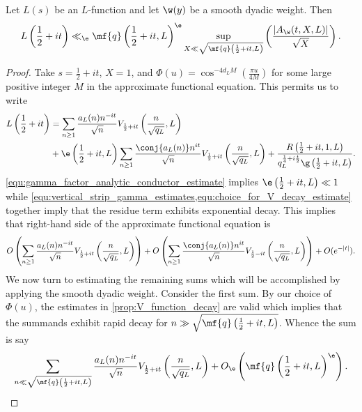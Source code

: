 \documentclass[12pt]{article}
\begin{document}
      \begin{theorem}\label{thm:critical_line_estimate}
        Let \(L(s)\) be an \(L\)-function and let \(\w(y)\) be a smooth dyadic weight. Then
        \[
          L\left(\frac{1}{2}+it\right) \ll_{\e} \mf{q}\left(\frac{1}{2}+it,L\right)^{\e}\sup_{X \ll \sqrt{\mf{q}\left(\frac{1}{2}+it,L\right)}}\left(\frac{|A_{\w}(t,X,L)|}{\sqrt{X}}\right).
        \]
      \end{theorem}
      \begin{proof}
        Take \(s = \frac{1}{2}+it\), \(X = 1\), and \(\Phi(u) = \cos^{-4d_{L}M}\left(\frac{\pi u}{4M}\right)\) for some large positive integer \(M\) in the approximate functional equation. This permits us to write
        \begin{align*}
          L\left(\frac{1}{2}+it\right) &= \sum_{n \ge 1}\frac{a_{L}(n)n^{-it}}{\sqrt{n}}V_{\frac{1}{2}+it}\left(\frac{n}{\sqrt{q_{L}}},L\right) \\
          &+ \e\left(\frac{1}{2}+it,L\right)\sum_{n \ge 1}\frac{\conj{a_{L}(n)}n^{it}}{\sqrt{n}}V_{\frac{1}{2}+it}\left(\frac{n}{\sqrt{q_{L}}},L\right)+\frac{R\left(\frac{1}{2}+it,1,L\right)}{q_{L}^{\frac{1}{4}+i\frac{t}{2}}\g\left(\frac{1}{2}+it,L\right)}.
        \end{align*}
        \cref{equ:gamma_factor_analytic_conductor_estimate} implies \(\e\left(\frac{1}{2}+it,L\right) \ll 1\) while \cref{equ:vertical_strip_gamma_estimates,equ:choice_for_V_decay_estimate} together imply that the residue term exhibits exponential decay. This implies that right-hand side of the approximate functional equation is
        \begin{align*}
          O\left(\sum_{n \ge 1}\frac{a_{L}(n)n^{-it}}{\sqrt{n}}V_{\frac{1}{2}+it}\left(\frac{n}{\sqrt{q_{L}}},L\right)\right)+O\left(\sum_{n \ge 1}\frac{\conj{a_{L}(n)}n^{it}}{\sqrt{n}}V_{\frac{1}{2}-it}\left(\frac{n}{\sqrt{q_{L}}},L\right)\right)+O(e^{-|t|}).
        \end{align*}
        We now turn to estimating the remaining sums which will be accomplished by applying the smooth dyadic weight. Consider the first sum. By our choice of \(\Phi(u)\), the estimates in \cref{prop:V_function_decay} are valid which implies that the summands exhibit rapid decay for \(n \gg \sqrt{\mf{q}\left(\frac{1}{2}+it,L\right)}\). Whence the sum is say
        \[
          \sum_{n \ll \sqrt{\mf{q}\left(\frac{1}{2}+it,L\right)}}\frac{a_{L}(n)n^{-it}}{\sqrt{n}}V_{\frac{1}{2}+it}\left(\frac{n}{\sqrt{q_{L}}},L\right)+O_{\e}\left(\mf{q}\left(\frac{1}{2}+it,L\right)^{\e}\right).
\]
\end{proof}
\end{document}
